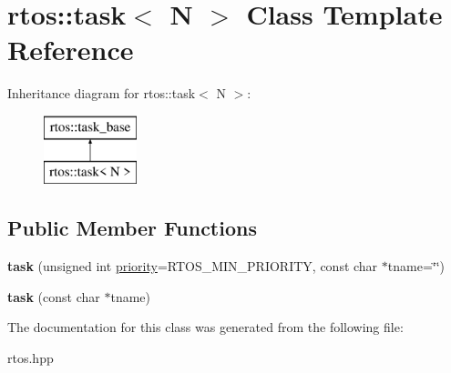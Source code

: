 \hypertarget{classrtos_1_1task}{}\section{rtos\+:\+:task$<$ N $>$ Class Template Reference}
\label{classrtos_1_1task}
Inheritance diagram for rtos\+:\+:task$<$ N $>$\+:\begin{figure}[H]
\begin{center}
\leavevmode
\includegraphics[height=2.000000cm]{classrtos_1_1task}
\end{center}
\end{figure}
\subsection*{Public Member Functions}
\begin{DoxyCompactItemize}
\item 
{\bfseries task} (unsigned int \hyperlink{classrtos_1_1task__base_aca1f728cef4c3e70e1ce08b6e313b586}{priority}=R\+T\+O\+S\+\_\+\+M\+I\+N\+\_\+\+P\+R\+I\+O\+R\+I\+TY, const char $\ast$tname=\char`\"{}\char`\"{})\hypertarget{classrtos_1_1task_a36f4e4a5aa5bfbcf35df75858d4d5abd}{}\label{classrtos_1_1task_a36f4e4a5aa5bfbcf35df75858d4d5abd}

\item 
{\bfseries task} (const char $\ast$tname)\hypertarget{classrtos_1_1task_a524617b96daa37e19fe438ec4eb866f0}{}\label{classrtos_1_1task_a524617b96daa37e19fe438ec4eb866f0}

\end{DoxyCompactItemize}


The documentation for this class was generated from the following file\+:\begin{DoxyCompactItemize}
\item 
rtos.\+hpp\end{DoxyCompactItemize}
